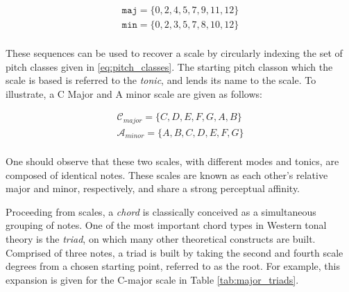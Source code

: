 \begin{align*}
\texttt{maj} = \{0, 2, 4, 5, 7, 9, 11, 12\} \\
\texttt{min} = \{0, 2, 3, 5, 7, 8, 10, 12\} \\
\end{align*}

These sequences can be used to recover a scale by circularly indexing the set of pitch classes given in \ref{eq:pitch_classes}.
The starting pitch classon which the scale is based is referred to the \emph{tonic}, and lends its name to the scale.
To illustrate, a C Major and A minor scale are given as follows:

\begin{align*}
\mathcal{C}_{major} = \{C, D, E, F, G, A, B\} \\
\mathcal{A}_{minor} = \{A, B, C, D, E, F, G\} \\
\end{align*}

One should observe that these two scales, with different modes and tonics, are composed of identical notes.
These scales are known as each other's relative major and minor, respectively, and share a strong perceptual affinity.



Proceeding from scales, a \emph{chord} is classically conceived as a simultaneous grouping of notes.
One of the most important chord types in Western tonal theory is the \emph{triad}, on which many other theoretical constructs are built.
Comprised of three notes, a triad is built by taking the second and fourth scale degrees from a chosen starting point, referred to as the root.
For example, this expansion is given for the C-major scale in Table \ref{tab:major_triads}.

